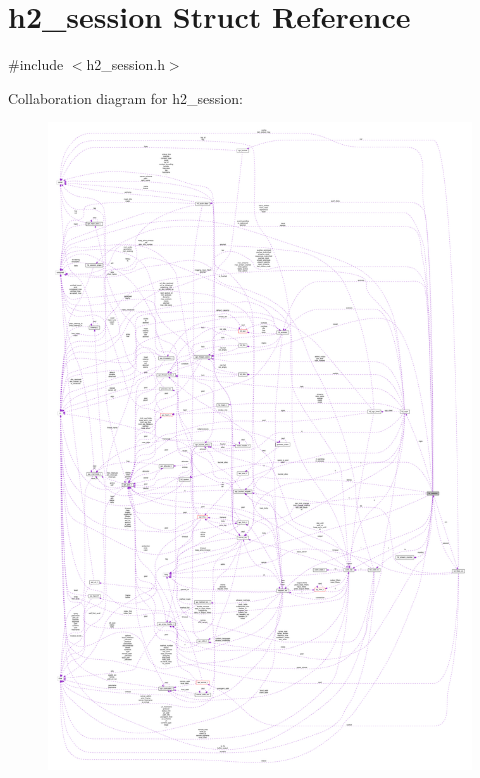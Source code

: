 \hypertarget{structh2__session}{}\section{h2\+\_\+session Struct Reference}
\label{structh2__session}


{\ttfamily \#include $<$h2\+\_\+session.\+h$>$}



Collaboration diagram for h2\+\_\+session\+:
\nopagebreak
\begin{figure}[H]
\begin{center}
\leavevmode
\includegraphics[width=350pt]{structh2__session__coll__graph}
\end{center}
\end{figure}
